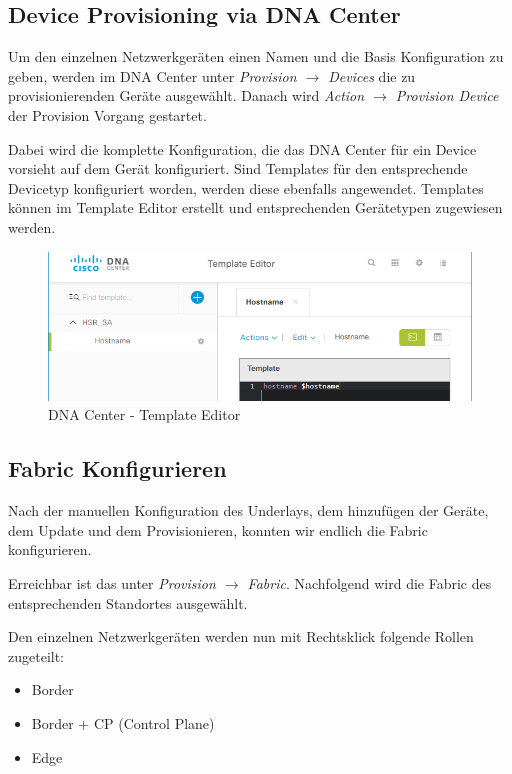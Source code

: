\subsection{Device Provisioning via DNA Center}
\label{device-provisioning}
Um den einzelnen Netzwerkgeräten einen Namen und die Basis Konfiguration zu geben, werden im DNA Center unter \textit{Provision $\rightarrow$ Devices} die zu provisionierenden Geräte ausgewählt. Danach wird \textit{Action $\rightarrow$ Provision Device} der Provision Vorgang gestartet.

Dabei wird die komplette Konfiguration, die das DNA Center für ein Device vorsieht auf dem Gerät konfiguriert. Sind Templates für den entsprechende Devicetyp konfiguriert worden, werden diese ebenfalls angewendet.
Templates können im Template Editor erstellt und entsprechenden Gerätetypen zugewiesen werden.

\begin{figure}[H]
	\centering
	\includegraphics[width=12cm]{img/templateeditor.png}
	\caption{DNA Center - Template Editor}
	\label{fig:Template Editor}
\end{figure}


\subsection{Fabric Konfigurieren}
\label{fabric-configuration}
Nach der manuellen Konfiguration des Underlays, dem hinzufügen der Geräte, dem Update und dem Provisionieren, konnten wir endlich die Fabric konfigurieren. 

Erreichbar ist das unter \textit{Provision $\rightarrow$ Fabric}. Nachfolgend wird die Fabric des entsprechenden Standortes ausgewählt.

Den einzelnen Netzwerkgeräten werden nun mit Rechtsklick folgende Rollen zugeteilt:
\begin{itemize}
	\item Border
	\item Border + CP (Control Plane)
	\item Edge
\end{itemize}

